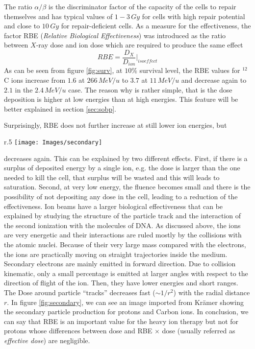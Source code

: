 \documentclass[12pt, a4paper, twoside]{book}
\begin{document}
The ratio $\alpha/\beta$ is the discriminator factor of the capacity of the cells to repair themselves and has typical values of $1-3\, Gy$ for cells with high repair potential and close to $10\, Gy$ for repair-deficient cells.
As a measure for the effectiveness, the factor RBE (\emph{Relative Biological Effectiveness}) was introduced as the ratio between $X$-ray dose and ion dose which are required to produce the same effect
\[
RBE = \frac{D_X}{D_{ion}}\Bigg|_{isoeffect}
\]
As can be seen from figure \ref{fig:surv}, at $10\%$ survival level, the RBE values for $^{12}$C ions increase from $1.6$ at $266\,MeV/u$ to $3.7$ at $11\,MeV/u$ and decrease again to $2.1$ in the $2.4\,MeV/u$ case. The reason why is rather simple, that is the dose deposition is higher at low energies than at high energies. This feature will be better explained in section \ref{sec:sobp}.

Surprisingly, RBE does not further increase at still lower ion energies, but 
\begin{wrapfigure}{r}{.5\textwidth}
\centering
{\texttt{[image: Images/secondary]}}
\caption{Monte-Carlo simulations showing individual tracks of $\delta$-electrons produced by energetic protons and $^{12}C$ ions penetrating the tissue. From Kr\"amer \cite{Kram:track}}
\label{fig:secondary}
\end{wrapfigure}
\noindent decreases again. This can be explained by two different effects. First, if there is a surplus of deposited energy by a single ion, e.g. the dose is larger than the one needed to kill the cell, that surplus will be wasted and this will leads to saturation. Second, at very low energy, the fluence becomes small and there is the possibility of not depositing any dose in the cell, leading to a reduction of the effectiveness.
Ion beams have a larger biological effectiveness that can be explained by studying the structure of the particle track and the interaction of the second ionization with the molecules of DNA. 
As discussed above, the ions are very energetic and their interactions are ruled mostly by the collisions with the atomic nuclei. Because of their very large mass compared with the electrons, the ions are practically moving on straight trajectories inside the medium.
Secondary electrons are mainly emitted in forward direction.
Due to collision kinematic, only a small percentage is emitted at larger angles with respect to the direction of flight of the ion. Then, they have lower energies and short ranges. The Dose around particle ``tracks'' decreases fast ($\sim1/r^2$) with the radial distance $r$. In figure \ref{fig:secondary}, we can see an image imported from Kr\"amer \cite{Kram:track} showing the secondary particle production for protons and Carbon ions.
In conclusion, we can say that RBE is an important value for the heavy ion therapy but not for protons whose differences between dose and RBE $\times$ dose (usually referred as \emph{effective dose}) are negligible.
\end{document}
